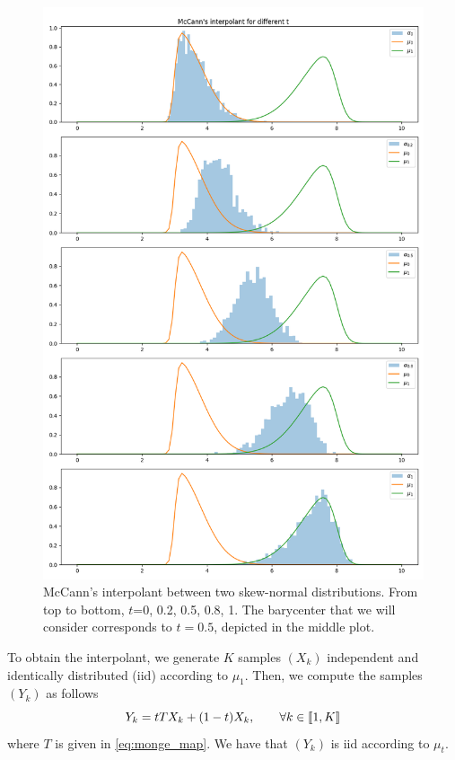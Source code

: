 \begin{figure}
    \centering
    \includegraphics[width=\textwidth]{figures/mccann_1D_2skew.png}
    \caption{McCann's interpolant between two skew-normal distributions. From top to bottom, $t$=0, 0.2, 0.5, 0.8, 1. The barycenter that we will consider corresponds to $t=0.5$, depicted in the middle plot.}
    \label{fig:mccann_1D_2skew}
\end{figure}

To obtain the interpolant, we generate $K$ samples $(X_k)$ independent and identically distributed (iid) according to $\mu_1$. Then, we compute the samples $(Y_k)$ as follows 
$$Y_k = tT X_k + (1-t)X_k, \qquad \forall k \in[\![ 1, K ]\!]$$ 
where $T$ is given in \eqref{eq:monge_map}. We have that $ (Y_k)$ is iid according to $\mu_t$.

